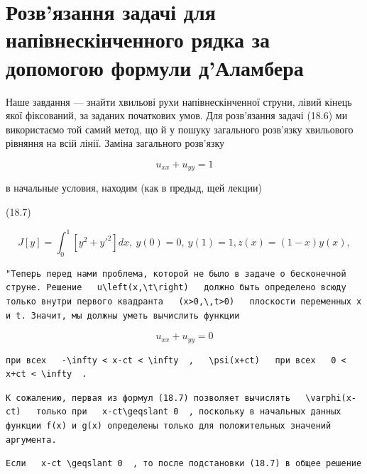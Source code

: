 \documentclass[
  ukrainian,
]{article}
\begin{document}
\section{Розв'язання задачі для напівнескінченного рядка за допомогою
формули
д'Аламбера}\label{ux440ux43eux437ux432ux44fux437ux430ux43dux43dux44f-ux437ux430ux434ux430ux447ux456-ux434ux43bux44f-ux43dux430ux43fux456ux432ux43dux435ux441ux43aux456ux43dux447ux435ux43dux43dux43eux433ux43e-ux440ux44fux434ux43aux430-ux437ux430-ux434ux43eux43fux43eux43cux43eux433ux43eux44e-ux444ux43eux440ux43cux443ux43bux438-ux434ux430ux43bux430ux43cux431ux435ux440ux430}

Наше завдання --- знайти хвильові рухи напівнескінченної струни, лівий
кінець якої фіксований, за заданих початкових умов. Для розв'язання
задачі (18.6) ми використаємо той самий метод, що й у пошуку загального
розв'язку хвильового рівняння на всій лінії. Заміна загального розв'язку

\[
u_{xx} + u_{yy} = 1
\]

в начальные условия, находим (как в предыд, щей лекции)

(18.7)

\[
J[y] = \int_{0}^{1} [y^{2} + {y'}^{2}] dx, \ y(0) = 0, \ y(1) = 1,
z(x) = (1 - x) y(x),
\]

\begin{verbatim}
"Теперь перед нами проблема, которой не было в задаче о бесконечной струне. Решение   u\left(x,\t\right)   должно быть определено всюду только внутри первого квадранта   (x>0,\,t>0)   плоскости переменных x и t. Значит, мы должны уметь вычислить функции
\end{verbatim}

\[
u_{xx} + u_{yy} = 0
\]

\begin{verbatim}
при всех   -\infty < x-ct < \infty  ,   \psi(x+ct)   при всех   0 < x+ct < \infty  .
\end{verbatim}

\begin{verbatim}
К сожалению, первая из формул (18.7) позволяет вычислять   \varphi(x-ct)   только при   x-ct\geqslant 0  , поскольку в начальных данных функции f(x) и g(x) определены только для положительных значений аргумента.
\end{verbatim}

\begin{verbatim}
Если   x-ct \geqslant 0  , то после подстановки (18.7) в общее решение
\end{verbatim}
\end{document}
